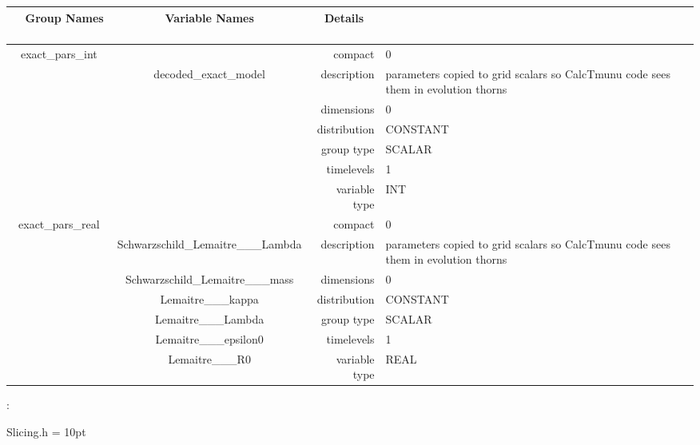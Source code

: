 \begin{tabular*}{150mm}{|c|c@{\extracolsep{\fill}}|rl|} \hline 
~ {\bf Group Names} ~ & ~ {\bf Variable Names} ~  &{\bf Details} ~ & ~\\ 
\hline 
exact\_pars\_int &  & compact & 0 \\ 
 & decoded\_exact\_model & description & parameters copied to grid scalars so CalcTmunu code sees them in evolution thorns \\ 
 &  & dimensions & 0 \\ 
 &  & distribution & CONSTANT \\ 
 &  & group type & SCALAR \\ 
 &  & timelevels & 1 \\ 
 &  & variable type & INT \\ 
\hline 
exact\_pars\_real &  & compact & 0 \\ 
 & Schwarzschild\_Lemaitre\_\_\_Lambda & description & parameters copied to grid scalars so CalcTmunu code sees them in evolution thorns \\ 
 & Schwarzschild\_Lemaitre\_\_\_mass & dimensions & 0 \\ 
 & Lemaitre\_\_\_kappa & distribution & CONSTANT \\ 
 & Lemaitre\_\_\_Lambda & group type & SCALAR \\ 
 & Lemaitre\_\_\_epsilon0 & timelevels & 1 \\ 
 & Lemaitre\_\_\_R0 & variable type & REAL \\ 
\hline 
\end{tabular*} 



\vspace{5mm}

: 

Slicing.h
\vspace{2mm}\parskip = 10pt 
